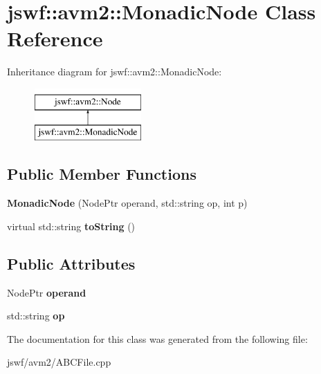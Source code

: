 \hypertarget{classjswf_1_1avm2_1_1_monadic_node}{\section{jswf\+:\+:avm2\+:\+:Monadic\+Node Class Reference}
\label{classjswf_1_1avm2_1_1_monadic_node}
}
Inheritance diagram for jswf\+:\+:avm2\+:\+:Monadic\+Node\+:\begin{figure}[H]
\begin{center}
\leavevmode
\includegraphics[height=2.000000cm]{classjswf_1_1avm2_1_1_monadic_node}
\end{center}
\end{figure}
\subsection*{Public Member Functions}
\begin{DoxyCompactItemize}
\item 
\hypertarget{classjswf_1_1avm2_1_1_monadic_node_ae26d0e2b593441fd0ddd6670c7e1d3d6}{{\bfseries Monadic\+Node} (Node\+Ptr operand, std\+::string op, int p)}\label{classjswf_1_1avm2_1_1_monadic_node_ae26d0e2b593441fd0ddd6670c7e1d3d6}

\item 
\hypertarget{classjswf_1_1avm2_1_1_monadic_node_aa3dbe7cb7c57305fdd2649d93a23471c}{virtual std\+::string {\bfseries to\+String} ()}\label{classjswf_1_1avm2_1_1_monadic_node_aa3dbe7cb7c57305fdd2649d93a23471c}

\end{DoxyCompactItemize}
\subsection*{Public Attributes}
\begin{DoxyCompactItemize}
\item 
\hypertarget{classjswf_1_1avm2_1_1_monadic_node_a24792b404886c9e9a3a8ac398be07c4c}{Node\+Ptr {\bfseries operand}}\label{classjswf_1_1avm2_1_1_monadic_node_a24792b404886c9e9a3a8ac398be07c4c}

\item 
\hypertarget{classjswf_1_1avm2_1_1_monadic_node_a189bf24fbae403be51686b6aa7c88346}{std\+::string {\bfseries op}}\label{classjswf_1_1avm2_1_1_monadic_node_a189bf24fbae403be51686b6aa7c88346}

\end{DoxyCompactItemize}


The documentation for this class was generated from the following file\+:\begin{DoxyCompactItemize}
\item 
jswf/avm2/A\+B\+C\+File.\+cpp\end{DoxyCompactItemize}
